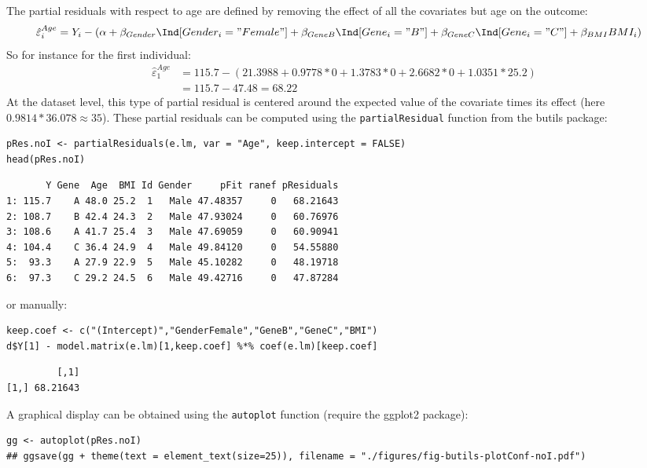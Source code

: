 \documentclass[12pt]{article}
\begin{document}
The partial residuals with respect to age are defined by removing the
effect of all the covariates but age on the outcome:
\begin{align*}
\hat{\varepsilon}^{Age}_i &= Y_i - \left(\alpha + \beta_{Gender} \Ind[Gender_i="Female"] + \beta_{GeneB} \Ind[Gene_i="B"] + \beta_{GeneC} \Ind[Gene_i="C"]  + \beta_{BMI} BMI_i\right)
\end{align*}
So for instance for the first individual:
\begin{align*}
\hat{\varepsilon}^{Age}_1 &= 115.7 - \left(21.3988 + 0.9778 * 0 + 1.3783 * 0 + 2.6682 * 0 + 1.0351 * 25.2\right) \\
                         &= 115.7 - 47.48 = 68.22
\end{align*}
At the dataset level, this type of partial residual is centered around
the expected value of the covariate times its effect (here
\(0.9814*36.078 \approx 35\)). These partial residuals can be
computed using the \texttt{partialResidual} function from the butils package:
\lstset{language=r,label= ,caption= ,captionpos=b,numbers=none}
\begin{lstlisting}
pRes.noI <- partialResiduals(e.lm, var = "Age", keep.intercept = FALSE)
head(pRes.noI)
\end{lstlisting}

\begin{verbatim}
       Y Gene  Age  BMI Id Gender     pFit ranef pResiduals
1: 115.7    A 48.0 25.2  1   Male 47.48357     0   68.21643
2: 108.7    B 42.4 24.3  2   Male 47.93024     0   60.76976
3: 108.6    A 41.7 25.4  3   Male 47.69059     0   60.90941
4: 104.4    C 36.4 24.9  4   Male 49.84120     0   54.55880
5:  93.3    A 27.9 22.9  5   Male 45.10282     0   48.19718
6:  97.3    C 29.2 24.5  6   Male 49.42716     0   47.87284
\end{verbatim}

or manually:
\lstset{language=r,label= ,caption= ,captionpos=b,numbers=none}
\begin{lstlisting}
keep.coef <- c("(Intercept)","GenderFemale","GeneB","GeneC","BMI")
d$Y[1] - model.matrix(e.lm)[1,keep.coef] %*% coef(e.lm)[keep.coef]
\end{lstlisting}

\begin{verbatim}
         [,1]
[1,] 68.21643
\end{verbatim}

A graphical display can be obtained using the \texttt{autoplot} function
(require the ggplot2 package):
\lstset{language=r,label= ,caption= ,captionpos=b,numbers=none}
\begin{lstlisting}
gg <- autoplot(pRes.noI)
## ggsave(gg + theme(text = element_text(size=25)), filename = "./figures/fig-butils-plotConf-noI.pdf")
\end{lstlisting}
\end{document}
